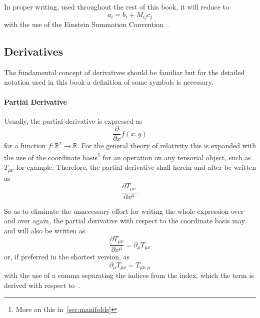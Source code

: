 In proper writing, used throughout the rest of this book, it will 
reduce to 
\begin{equation}
  a_i = b_i + M_{ij}c_j 
  \label{eq:proper-summation-convention}
\end{equation}
with the use of the Einstein Summation 
Convention~\cite{Article:summation_convention_02_lei}.

\subsection{Derivatives}
\label{subsec:derivatives}

The fundamental concept of derivatives should be familiar but for 
the detailed notation used in this book a definition of some 
symbols is necessary.

\paragraph{Partial Derivative}

Usually, the partial derivative is expressed as 
\begin{equation}
  \frac{\partial}{\partial x}f(x,y)
  \label{eq:partial-derivative}
\end{equation}
for a function $f: \mathbb{R}^2 \rightarrow \mathbb{R}$. 
For the general theory of relativity this is expanded with the use 
of the coordinate basis\footnote{More on this in~\ref{sec:manifolds}} 
for an operation on any tensorial object, such as $T_{\mu\nu}$ 
for example. Therefore, the partial derivative shall herein and 
after be written as 
\begin{equation}
  \frac{\partial T_{\mu \nu}}{\partial x^{\mu}}.
  \label{eq:partial-derivative-gr}
\end{equation}

So as to eliminate the unnecessary effort for writing the whole expression 
over and over again, the partial derivative with respect to the 
coordinate basis may and will also be written as 
\begin{equation}
  \frac{\partial T_{\mu \nu}}{\partial x^{\mu}} = \partial_{\mu}T_{\mu \nu}
  \label{eq:partial-short}
\end{equation}
or, if preferred in the shortest version, as 
\begin{equation}
  \partial_{\mu}T_{\mu \nu} = T_{\mu \nu ,\mu}
  \label{eq:partial-very-short}
\end{equation}
with the use of a comma separating the indices from the index, which the term is 
derived with respect to~\cite{Book:general_relativity_01_wald,Book:general_relativity_02_dirac,Book:general_relativity_03_carroll}.

